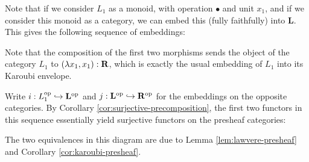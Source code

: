 Note that if we consider $ L_1 $ as a monoid, with operation $ \bullet $ and unit $ x_1 $, and if we consider this monoid as a category, we can embed this (fully faithfully) into $ \mathbf L $. This gives the following sequence of embeddings:
\begin{center}
\end{center}

Note that the composition of the first two morphisms sends the object of the category $ L_1 $ to $ (\lambda x_1, x_1) : \mathbf{R} $, which is exactly the usual embedding of $ L_1 $ into its Karoubi envelope.

Write $ i: L_1^{\text{op}} \hookrightarrow \mathbf L^{\text{op}} $ and $ j: \mathbf L^{\text{op}} \hookrightarrow \mathbf{R}^{\text{op}} $ for the embeddings on the opposite categories. By Corollary \ref{cor:surjective-precomposition}, the first two functors in this sequence essentially yield surjective functors on the presheaf categories:
\begin{center}
\end{center}
The two equivalences in this diagram are due to Lemma \ref{lem:lawvere-presheaf} and Corollary \ref{cor:karoubi-presheaf}.

